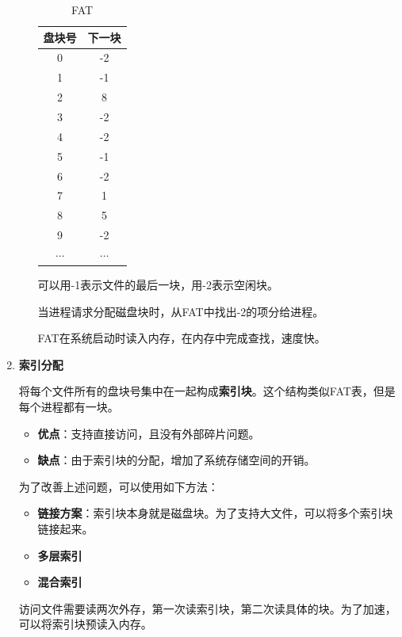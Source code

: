 \documentclass[12pt, a4paper, oneside]{ctexart}
\begin{document}
\begin{enumerate}
\begin{itemize}
    \begin{table}
      \centering
      \begin{tabular}{|c|c|}
        \hline
        \textbf{盘块号} & \textbf{下一块} \\ \hline
        0 & -2 \\ \hline
        1 & -1 \\ \hline
        2 & 8 \\ \hline
        3 & -2 \\ \hline
        4 & -2 \\ \hline
        5 & -1 \\ \hline
        6 & -2 \\ \hline
        7 & 1 \\ \hline
        8 & 5 \\ \hline
        9 & -2 \\ \hline
        $\cdots$ & $\cdots$ \\ \hline
      \end{tabular}
      \caption{FAT}
    \end{table}

    可以用-1表示文件的最后一块，用-2表示空闲块。

    当进程请求分配磁盘块时，从FAT中找出-2的项分给进程。

    FAT在系统启动时读入内存，在内存中完成查找，速度快。
  \end{itemize}

  \item {\bf 索引分配} \label{index-allocation}
  
  将每个文件所有的盘块号集中在一起构成\textbf{索引块}。这个结构类似FAT表，但是每个进程都有一块。
  \begin{itemize}
    \item {\bf 优点}：支持直接访问，且没有外部碎片问题。
    \item {\bf 缺点}：由于索引块的分配，增加了系统存储空间的开销。
  \end{itemize}
  为了改善上述问题，可以使用如下方法：
  \begin{itemize}
    \item {\bf 链接方案}：索引块本身就是磁盘块。为了支持大文件，可以将多个索引块链接起来。
    \item {\bf 多层索引}
    \item {\bf 混合索引}
  \end{itemize}

  访问文件需要读两次外存，第一次读索引块，第二次读具体的块。为了加速，可以将索引块预读入内存。


\end{enumerate}
\end{document}

